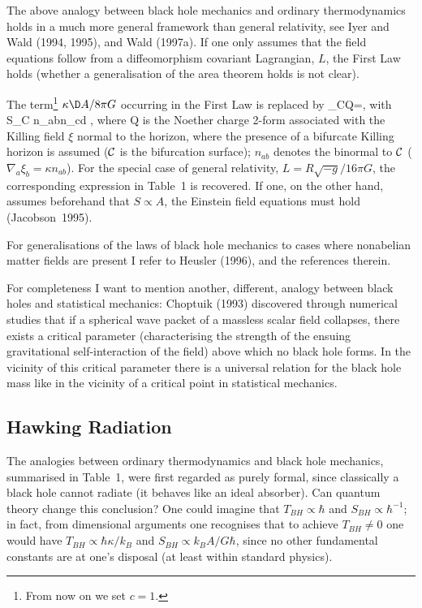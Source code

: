 \vskip 2mm
\normalsize

The above analogy between black hole mechanics and
ordinary thermodynamics holds in a much more general framework
than general relativity,
see Iyer and Wald (1994, 1995), and Wald (1997a).
 If one only assumes that the field
equations follow from a diffeomorphism covariant Lagrangian, $L$,
the First Law holds (whether a generalisation
of the area theorem holds is not clear). 

\vskip 2mm
\small

The term\footnote{From now on we set $c=1$.}
 $\kappa \D A/8\pi G$ occurring in the First Law 
is replaced by
\be \D\int_{\cal C}\mbox{Q}=\frac{\kappa}{2\pi}, \quad
    \mbox{with } {\cal S}\pi\int_{\cal C}
     n_{ab}n_{cd} \enspace, \ee
where $\mbox{Q}$ is the Noether charge 2-form associated with the
Killing field $\xi$ normal to the horizon, where the presence
of a bifurcate Killing horizon is assumed (${\cal C}$ is the
bifurcation surface); $n_{ab}$ denotes the binormal to
${\cal C}$ ($\nabla_a\xi_b=\kappa n_{ab}$). For the special case
of general relativity, $L=R\sqrt{-g}/16\pi G$, the corresponding
expression in Table~1 is recovered. If one, on the other hand,
assumes beforehand that $S\propto A$,
the Einstein field equations must hold (Jacobson~1995).

\vskip 2mm
\normalsize

For generalisations of the laws of black hole mechanics to
cases where nonabelian matter fields are present I refer
to Heusler (1996), and the references therein.

For completeness I want to mention another, different, analogy between
black holes and statistical mechanics: 
Choptuik (1993) discovered through numerical studies
 that if a spherical wave packet of a massless
scalar field collapses, there exists a critical parameter
(characterising the strength of the ensuing gravitational
self-interaction of the field)
above which no black hole forms. In the vicinity of this
critical parameter there is a universal relation for
the black hole mass like in the vicinity of a critical point
in statistical mechanics. 

\subsection{Hawking Radiation}

The analogies between ordinary thermodynamics and black hole
mechanics, summarised in Table~1, were first regarded as purely formal,
since classically a black hole cannot radiate
(it behaves like an ideal absorber). Can quantum theory
change this conclusion? One could imagine that $T_{BH}\propto\hbar$
and $S_{BH}\propto\hbar^{-1}$; in fact, from dimensional
arguments one recognises that to achieve $T_{BH}\neq0$ one would
have $T_{BH}\propto \hbar\kappa/k_B$ and $S_{BH}\propto k_BA/G\hbar$,
since no other fundamental constants are at one's disposal
(at least within standard physics). 

